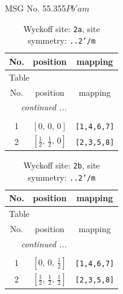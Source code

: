 \documentclass[fleqn,8pt]{jsarticle}
\begin{document}
\setcounter{MaxMatrixCols}{32}

\renewcommand{\tablename}{Table~}
\renewcommand{\figurename}{Figure~}
\begin{center}
\LARGE
MSG No. 55.355\quad$Pb'am$
\end{center}
\renewcommand{\arraystretch}{1.2}
\begin{longtable}{ccc}
\caption{Wyckoff site: {\tt 2a}, site symmetry: {\tt ..2'/m}}
 \\
 \hline \hline
No. & position & mapping \\ \hline \endfirsthead

\multicolumn{2}{l}{\tablename\ \thetable{}} \\
 \hline \hline
No. & position & mapping \\ \hline \endhead

 \hline \hline
\multicolumn{2}{r}{\footnotesize\it continued ...} \\ \endfoot

 \hline \hline
\multicolumn{2}{r}{} \\ \endlastfoot

1 & $\left[ 0,\, 0,\, 0 \right]$ & {\tt [1,4,6,7]} \\ \hline
2 & $\left[ \frac{1}{2},\, \frac{1}{2},\, 0 \right]$ & {\tt [2,3,5,8]} \\
\end{longtable}
\renewcommand{\arraystretch}{1.2}
\begin{longtable}{ccc}
\caption{Wyckoff site: {\tt 2b}, site symmetry: {\tt ..2'/m}}
 \\
 \hline \hline
No. & position & mapping \\ \hline \endfirsthead

\multicolumn{2}{l}{\tablename\ \thetable{}} \\
 \hline \hline
No. & position & mapping \\ \hline \endhead

 \hline \hline
\multicolumn{2}{r}{\footnotesize\it continued ...} \\ \endfoot

 \hline \hline
\multicolumn{2}{r}{} \\ \endlastfoot

1 & $\left[ 0,\, 0,\, \frac{1}{2} \right]$ & {\tt [1,4,6,7]} \\ \hline
2 & $\left[ \frac{1}{2},\, \frac{1}{2},\, \frac{1}{2} \right]$ & {\tt [2,3,5,8]} \\
\end{longtable}
\end{document}
